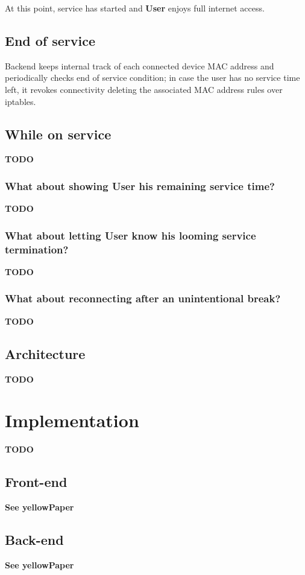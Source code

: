 \documentclass[12pt]{report}
\begin{document}
  At this point, service has started and \textbf{User} enjoys full internet access.

  \subsection{End of service}

  Backend keeps internal track of each connected device MAC address and periodically checks end of service condition; in case the user has no service time left, it revokes connectivity deleting the associated MAC address rules over iptables.

  \subsection{While on service}
  \textbf{TODO}

  \subsubsection{What about showing \textbf{User} his remaining service time?}
  \textbf{TODO}
  \subsubsection{What about letting \textbf{User} know his looming service termination?}
  \textbf{TODO}
  \subsubsection{What about reconnecting after an unintentional break?}
  \textbf{TODO}


  \subsection{Architecture} \label{ch:architecture}
  \textbf{TODO}

  \section{Implementation} \label{ch:implementation}
  \textbf{TODO}

  \subsection{Front-end} \label{ch:front-end}
  \textbf{ See yellowPaper}

  \subsection{Back-end} \label{ch:back-end}
  \textbf{ See yellowPaper}
\end{document}
